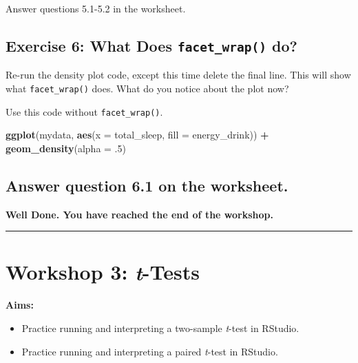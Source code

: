 \documentclass[
]{book}
\newenvironment{Shaded}{\begin{snugshade}}{\end{snugshade}}
\newcommand{\AttributeTok}[1]{\textcolor[rgb]{0.13,0.29,0.53}{#1}}
\newcommand{\DecValTok}[1]{\textcolor[rgb]{0.00,0.00,0.81}{#1}}
\newcommand{\FunctionTok}[1]{\textcolor[rgb]{0.13,0.29,0.53}{\textbf{#1}}}
\newcommand{\NormalTok}[1]{#1}
\newcommand{\SpecialCharTok}[1]{\textcolor[rgb]{0.81,0.36,0.00}{\textbf{#1}}}
\let\oldsection\section
\renewcommand{\section}{\needspace{5\baselineskip}\oldsection}
\begin{document}
Answer questions 5.1-5.2 in the worksheet.

\section{\texorpdfstring{Exercise 6: What Does \texttt{facet\_wrap()} do?}{Exercise 6: What Does facet\_wrap() do?}}\label{exercise-6-what-does-facet_wrap-do}

Re-run the density plot code, except this time delete the final line. This will show what \texttt{facet\_wrap()} does. What do you notice about the plot now?

Use this code without \texttt{facet\_wrap()}.

\begin{Shaded}
\begin{Highlighting}[]
\FunctionTok{ggplot}\NormalTok{(mydata, }\FunctionTok{aes}\NormalTok{(}\AttributeTok{x =}\NormalTok{ total\_sleep, }\AttributeTok{fill =}\NormalTok{ energy\_drink)) }\SpecialCharTok{+}
  \FunctionTok{geom\_density}\NormalTok{(}\AttributeTok{alpha =}\NormalTok{ .}\DecValTok{5}\NormalTok{)}
\end{Highlighting}
\end{Shaded}

\section{Answer question 6.1 on the worksheet.}\label{answer-question-6.1-on-the-worksheet.}

\textbf{Well Done. You have reached the end of the workshop.}

\begin{center}\rule{0.5\linewidth}{0.5pt}\end{center}

\chapter{\texorpdfstring{Workshop 3: \emph{t}-Tests}{Workshop 3: t-Tests}}\label{workshop-3-t-tests}

\textbf{Aims:}

\begin{itemize}
\item
  Practice running and interpreting a two-sample \emph{t}-test in RStudio.
\item
  Practice running and interpreting a paired \emph{t}-test in RStudio.
\end{itemize}
\end{document}
